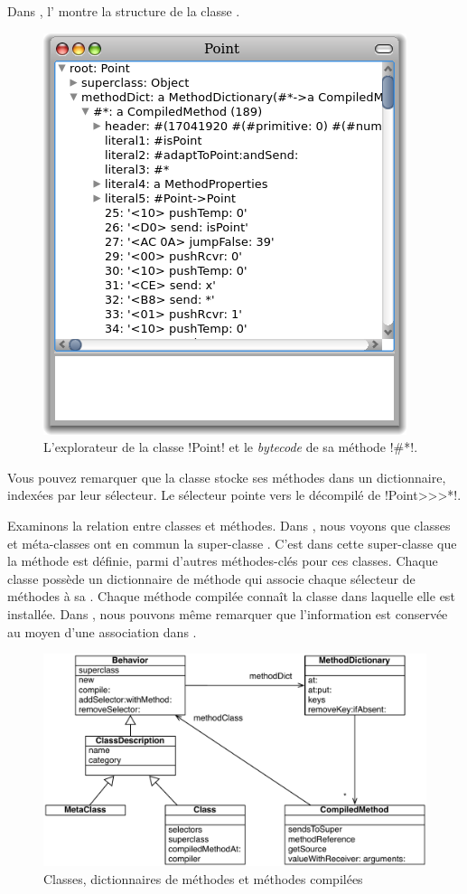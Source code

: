 \documentclass[a4paper,10pt,twoside]{book}
\begin{document}
Dans , l' montre la structure de la classe .
\begin{figure}[ht]\centering    %
	\includegraphics[width=.5\linewidth]{CompiledMethod}
	\caption{L'explorateur de la classe \ct!Point! et le \emph{bytecode} de sa méthode \ct!\#*!.}
\end{figure}

Vous pouvez remarquer que la classe stocke ses méthodes dans un dictionnaire, indexées par leur sélecteur.
Le sélecteur \ct{#*} pointe vers le  décompilé de \ct!Point>>>*!.

Examinons la relation entre classes et méthodes.
Dans , nous voyons que classes et méta-classes ont en commun la super-classe . C'est dans cette super-classe que la méthode  est définie, parmi d'autres méthodes-clés pour ces classes. 
Chaque classe possède un dictionnaire de méthode qui associe chaque sélecteur de méthodes à sa .
Chaque méthode compilée connaît la classe dans laquelle elle est installée.
Dans , nous pouvons même remarquer que l'information est conservée au moyen d'une association dans .

\begin{figure}[ht]\centering
	\includegraphics[width=\linewidth]{MethodsAsObjects}
	\caption{Classes, dictionnaires de méthodes et méthodes compilées}
\end{figure}
\end{document}
